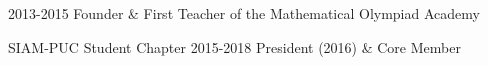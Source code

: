 
\begin{cventries}
  { }
  {}
  {2013-2015}
  {Founder \& First Teacher of the Mathematical Olympiad Academy}

  \cventry
  {SIAM-PUC Student Chapter}
  { }
  {}
  {2015-2018}
  {President (2016) \& Core Member}
\end{cventries}

